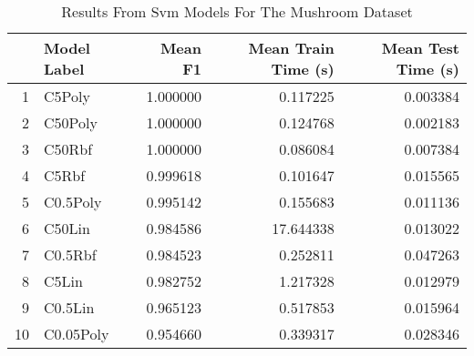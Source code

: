 \begin{table}
\centering
\caption{Results From Svm Models For The Mushroom Dataset}
\label{tab:svm_results_mushroom}
\begin{tabular}{rlrrr}
\toprule
 & Model Label & Mean F1 & Mean Train Time (s) & Mean Test Time (s) \\
\midrule
1 & C5Poly & 1.000000 & 0.117225 & 0.003384 \\
2 & C50Poly & 1.000000 & 0.124768 & 0.002183 \\
3 & C50Rbf & 1.000000 & 0.086084 & 0.007384 \\
4 & C5Rbf & 0.999618 & 0.101647 & 0.015565 \\
5 & C0.5Poly & 0.995142 & 0.155683 & 0.011136 \\
6 & C50Lin & 0.984586 & 17.644338 & 0.013022 \\
7 & C0.5Rbf & 0.984523 & 0.252811 & 0.047263 \\
8 & C5Lin & 0.982752 & 1.217328 & 0.012979 \\
9 & C0.5Lin & 0.965123 & 0.517853 & 0.015964 \\
10 & C0.05Poly & 0.954660 & 0.339317 & 0.028346 \\
\bottomrule
\end{tabular}
\end{table}
